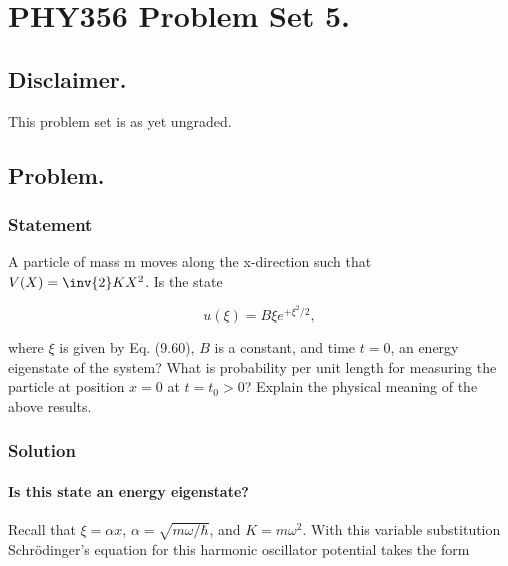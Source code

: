 %
%
%
%


\chapter{PHY356 Problem Set 5.}
\label{chap:qmIproblemSet5}
\date{Nov 25, 2010}

\beginArtNoToc
\section{Disclaimer.}

This problem set is as yet ungraded.

\section{Problem.}
\subsection{Statement}

A particle of mass m moves along the x-direction such that $V(X)=\inv{2}KX^2$. Is the state 

\begin{equation}\label{eqn:qmIproblemSet5:5}
u(\xi) = B \xi e^{+\xi^2/2},
\end{equation}

where $\xi$ is given by Eq. (9.60), $B$ is a constant, and time $t=0$, an energy eigenstate of the system?  What is probability per unit length for measuring the particle at position $x=0$ at $t=t_0>0$?  Explain the physical meaning of the above results.

\subsection{Solution}
\subsubsection{Is this state an energy eigenstate?}

Recall that $\xi = \alpha x$, $\alpha = \sqrt{m\omega/\hbar}$, and $K = m \omega^2$.  With this variable substitution Schr\"{o}dinger's equation for this harmonic oscillator potential takes the form

